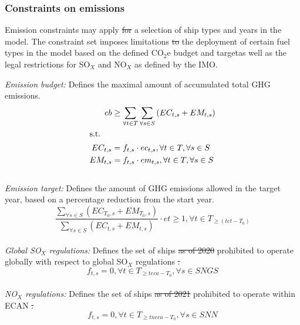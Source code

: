 \documentclass[article]{elsarticle}
\providecommand{\DIFaddtex}[1]{{\protect\color{blue}\uwave{#1}}} %
\providecommand{\DIFdeltex}[1]{{\protect\color{red}\sout{#1}}}                      %
\providecommand{\DIFaddbegin}{} %
\providecommand{\DIFaddend}{} %
\providecommand{\DIFdelbegin}{} %
\providecommand{\DIFdelend}{} %
\providecommand{\DIFadd}[1]{\texorpdfstring{\DIFaddtex{#1}}{#1}} %
\providecommand{\DIFdel}[1]{\texorpdfstring{\DIFdeltex{#1}}{}} %
\begin{document}
\subsubsection{Constraints on emissions}
\label{subsubsec:emconstraints}
Emission constraints may apply \DIFdelbegin \DIFdel{for }\DIFdelend \DIFaddbegin \DIFadd{to }\DIFaddend a selection of ship types and years in the model. The constraint set imposes limitations \DIFdelbegin \DIFdel{to }\DIFdelend \DIFaddbegin \DIFadd{on }\DIFaddend the deployment of certain fuel types in the model based on the defined CO$_2$e budget and target\DIFaddbegin \DIFadd{, }\DIFaddend as well as the legal restrictions for SO$_X$ and NO$_X$ as defined by the IMO.
\\\par\noindent
\textit{Emission budget: }Defines the maximal amount of accumulated total GHG emissions.
\begin{subequations}
    \begin{align}
    eb &\geq \sum_{\forall t \in T}\sum_{\forall s \in S}\left(EC_{t,s} + EM_{t,s} \right) \label{eq:co2ebudget}\\
    \intertext{s.t.}
    EC_{t,s} &= f_{t,s} \cdot ec_{t,s}, \forall t \in T, \forall s \in S\\
    EM_{t,s} &= f_{t,s} \cdot em_{t,s}, \forall t \in T, \forall s \in S
    \end{align}
\end{subequations}\\
\textit{Emission target: }Defines the amount of GHG emissions allowed in the target year, based on a percentage reduction from the start year.
\begin{equation}
    \frac{\sum_{\forall s \in S} \left(EC_{T_0,s}+EM_{T_0,s}\right)}{\sum_{\forall s \in S} \left(EC_{t,s}+EM_{t,s}\right)} \cdot et \geq 1, \forall t \in T_{\geq \left(tet-T_0\right)}
\end{equation}\\
\textit{Global SO$_X$ regulations: }Defines the set of ships \DIFdelbegin \DIFdel{as of 2020 }\DIFdelend prohibited to operate globally with respect to global SO$_X$ regulations \DIFdelbegin \DIFdel{.
}\DIFdelend \DIFaddbegin \DIFadd{as of 2020.
}\DIFaddend \begin{equation}
    f_{t,s} = 0, \forall t \in T_{\geq teca-T_0}, \forall s \in SNGS \label{eq:sox_global}
\end{equation}\\
\textit{NO$_X$ regulations: }Defines the set of ships \DIFdelbegin \DIFdel{as of 2021 }\DIFdelend prohibited to operate within ECAN \DIFdelbegin \DIFdel{.
}\DIFdelend \DIFaddbegin \DIFadd{as of 2021.
}\DIFaddend \begin{equation}
   f_{t,s} = 0, \forall t \in T_{\geq tneca-T_0},\forall s \in SNN \label{eq:tier}
\end{equation}
\end{document}
